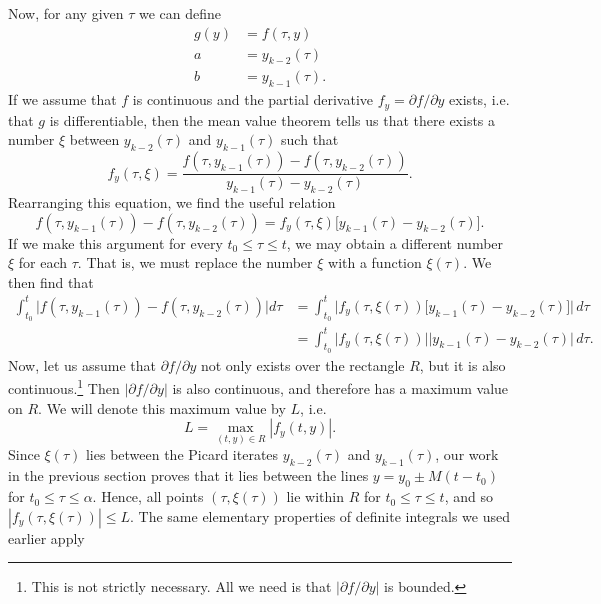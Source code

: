 \documentclass{myart}
\begin{document}
Now, for any given $\tau$ we can define
\begin{align*}
g(y) &= f(\tau, y) \\
a &= y_{k-2}(\tau) \\
b &= y_{k-1}(\tau).
\end{align*}
If we assume that $f$ is continuous and the partial derivative $f_y
= \partial f/\partial y$ exists, i.e. that $g$ is differentiable, then
the mean value theorem tells us that there exists a number $\xi$
between $y_{k-2}(\tau)$ and $y_{k-1}(\tau)$ such that
\begin{equation*}
  f_y(\tau, \xi)
= \frac{f(\tau, y_{k-1}(\tau)) - f(\tau, y_{k-2}(\tau))}
       {y_{k-1}(\tau) - y_{k-2}(\tau)}.
\end{equation*}
Rearranging this equation, we find the useful relation
\begin{equation*}
  f(\tau, y_{k-1}(\tau)) - f(\tau, y_{k-2}(\tau))
= f_y(\tau, \xi)\big[y_{k-1}(\tau) - y_{k-2}(\tau)\big].
\end{equation*}
If we make this argument for every $t_0 \leq \tau \leq t$, we may
obtain a different number $\xi$ for each $\tau$. That is, we must
replace the number $\xi$ with a function $\xi(\tau)$. We then find
that
\begin{align*}
   \int_{t_0}^t \Big|
     f(\tau, y_{k-1}(\tau)) - f(\tau, y_{k-2}(\tau))
   \Big| d\tau
&= \int_{t_0}^t \Big|
     f_y(\tau, \xi(\tau))\big[y_{k-1}(\tau) - y_{k-2}(\tau)\big]
   \Big| \,d\tau \\
&= \int_{t_0}^t \Big|
     f_y(\tau, \xi(\tau))\Big|\Big|y_{k-1}(\tau) - y_{k-2}(\tau)
   \Big| \,d\tau.
\end{align*}
Now, let us assume that $\partial f/\partial y$ not only exists over
the rectangle $R$, but it is also continuous.\footnote{This is not
  strictly necessary. All we need is that $|\partial f/\partial y|$ is
  bounded.} Then $|\partial f/\partial y|$ is also continuous, and
therefore has a maximum value on $R$. We will denote this maximum
value by $L$, i.e.
\begin{equation*}
L = \max_{(t, y) \in R} |f_y(t, y)|.
\end{equation*}
Since $\xi(\tau)$ lies between the Picard iterates $y_{k-2}(\tau)$ and
$y_{k-1}(\tau)$, our work in the previous section proves that it lies
between the lines $y = y_0 \pm M(t - t_0)$ for $t_0 \leq \tau \leq
\alpha$. Hence, all points $(\tau, \xi(\tau))$ lie within $R$ for $t_0
\leq \tau \leq t$, and so $|f_y(\tau, \xi(\tau))| \leq L$. The same
elementary properties of definite integrals we used earlier apply
\end{document}
